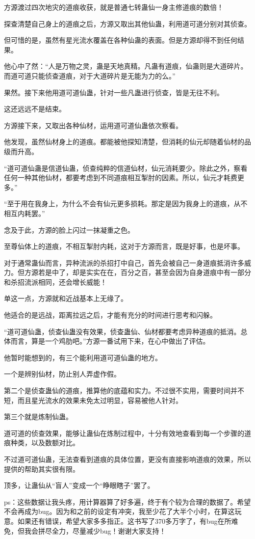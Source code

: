 \begin{this_body}
方源渡过四次地灾的道痕收获，就是普通七转蛊仙一身主修道痕的数倍！

探查清楚自己身上的道痕之后，方源又取出其他仙蛊，利用道可道分别对其侦查。

但可惜的是，虽然有星光流水覆盖在各种仙蛊的表面。但是方源却得不到任何结果。

他心中了然：“人是万物之灵，蛊是天地真精。凡蛊有道痕，仙蛊则是大道碎片。而道可道只能侦查道痕，对于大道碎片是无能为力的么。”

果然。接下来他用道可道仙蛊，针对一些凡蛊进行侦查，皆是无往不利。

这还远远不是结束。

方源接下来，又取出各种仙材，运用道可道仙蛊依次察看。

他发现，虽然仙材身上的道痕。都能被他探知清楚，但消耗的仙元却随着仙材的品级而升高。

“道可道仙蛊是信道仙蛊，侦查纯粹的信道仙材，仙元消耗要少。除此之外，察看任何一种其他仙材，都要考虑到不同道痕相互掣肘的因素。所以，仙元才耗费更多。”

“至于用在我身上，为什么不会有仙元更多损耗。那定是因为我身上的道痕，从不相互内耗罢。”

念及于此，方源的脸上闪过一抹凝重之色。

至尊仙体上的道痕，不相互掣肘内耗，这对于方源而言，既是好事，也是坏事。

对于通常蛊仙而言，异种流派的杀招打中自己，首先会被自己一身道痕抵消许多威力。但方源若是中了，却是实实在在，百分之百，甚至会因为自身道痕中有一部分和杀招流派相同，还会增长威能！

单这一点，方源就和近战基本上无缘了。

他适合的是远战，距离拉远之后，才能有充分的时间进行思考和闪躲。

“道可道仙蛊，侦查仙蛊没有效果，侦查蛊仙、仙材都要考虑异种道痕的抵消。总体而言，算是一个鸡肋吧。”方源一番试用下来，在心中做出了评估。

他暂时能想到的，有三个能利用道可道仙蛊的地方。

一个是辨别仙材，防止别人弄虚作假。

第二个是侦查蛊仙的道痕，推算他的底蕴和实力。不过很不实用，需要时间并不短，而且星光流水的效果未免太过明显，容易被他人针对。

第三个就是炼制仙蛊。

道可道的侦查效果，能够让蛊仙在炼制过程中，十分有效地查看到每一个步骤的道痕种类，以及数额对比。

不过道可道仙蛊，无法查看到道痕的具体位置，更没有直接影响道痕的效果，所以提供的帮助其实很有限。

顶多，让蛊仙从“盲人”变成一个“睁眼瞎子”罢了。

ps：这些数据让我头疼，用计算器算了好多遍，终于有个较为合理的数据了。希望不会再成为bug。因为和之前的设定有冲突，我至少花了大半个小时，在算这玩意。如果还有错误，希望大家多多指正。这书写了370多万字了，有bug在所难免，但我会拼尽全力，尽量减少bug！谢谢大家支持！

\end{this_body}

